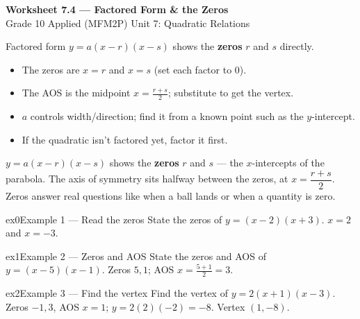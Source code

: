 \documentclass[11pt]{article}
\begin{document}
\begin{center}
{\LARGE\bfseries\color{titleblue}Worksheet 7.4 --- Factored Form \& the Zeros}\\[2pt]
{\small Grade 10 Applied (MFM2P) \textperiodcentered{} Unit 7: Quadratic Relations}
\end{center}

\begin{ideabox}
Factored form $y=a(x-r)(x-s)$ shows the \textbf{zeros} $r$ and $s$ directly.
\begin{itemize}[leftmargin=*,itemsep=2pt]
  \item The zeros are $x=r$ and $x=s$ (set each factor to $0$).
  \item The AOS is the midpoint $x=\tfrac{r+s}{2}$; substitute to get the vertex.
  \item $a$ controls width/direction; find it from a known point such as the $y$-intercept.
  \item If the quadratic isn't factored yet, factor it first.
\end{itemize}
\end{ideabox}

\begin{learnbox}
$y=a(x-r)(x-s)$ shows the \textbf{zeros} $r$ and $s$ — the $x$-intercepts of the parabola.
The axis of symmetry sits halfway between the zeros, at $x=\dfrac{r+s}{2}$.
Zeros answer real questions like when a ball lands or when a quantity is zero.
\end{learnbox}


\begin{example}{ex0}{Example 1 --- Read the zeros}
State the zeros of $y=(x-2)(x+3)$.
\soln $x=2$ and $x=-3.$
\end{example}

\begin{example}{ex1}{Example 2 --- Zeros and AOS}
State the zeros and AOS of $y=(x-5)(x-1)$.
\soln Zeros $5,1$; AOS $x=\tfrac{5+1}{2}=3.$
\end{example}

\begin{example}{ex2}{Example 3 --- Find the vertex}
Find the vertex of $y=2(x+1)(x-3)$.
\soln Zeros $-1,3$, AOS $x=1$; $y=2(2)(-2)=-8$. Vertex $(1,-8)$.
\end{example}
\end{document}
